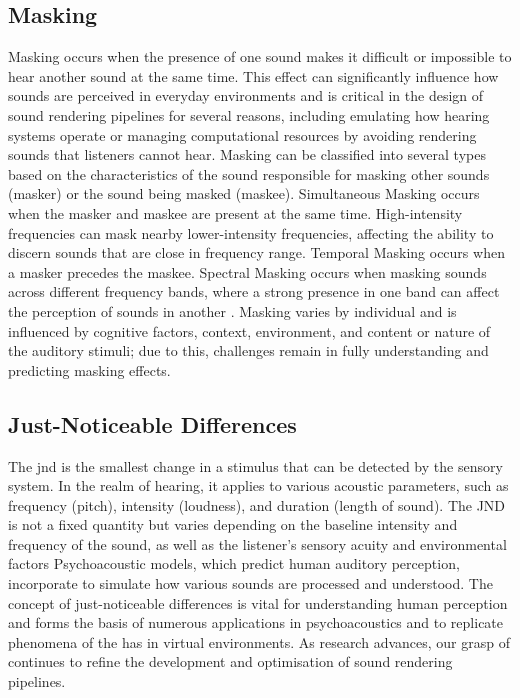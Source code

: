 \subsection{Masking}
Masking occurs when the presence of one sound makes it difficult or impossible to hear another sound at the same time. This effect can significantly influence how sounds are perceived in everyday environments and is critical in the design of sound rendering pipelines for several reasons, including emulating how hearing systems operate or managing computational resources by avoiding rendering sounds that listeners cannot hear.
Masking can be classified into several types based on the characteristics of the sound responsible for masking other sounds (masker) or the sound being masked (maskee). Simultaneous Masking occurs when the masker and maskee are present at the same time. High-intensity frequencies can mask nearby lower-intensity frequencies, affecting the ability to discern sounds that are close in frequency range. Temporal Masking occurs when a masker precedes the maskee. Spectral Masking occurs when masking sounds across different frequency bands, where a strong presence in one band can affect the perception of sounds in another \citep{howard2013acoustics}.
Masking varies by individual and is influenced by cognitive factors, context, environment, and content or nature of the auditory stimuli; due to this, challenges remain in fully understanding and predicting masking effects.

\subsection{Just-Noticeable Differences}
The \acrfull{jnd} is the smallest change in a stimulus that can be detected by the sensory system. In the realm of hearing, it applies to various acoustic parameters, such as frequency (pitch), intensity (loudness), and duration (length of sound). The JND is not a fixed quantity but varies depending on the baseline intensity and frequency of the sound, as well as the listener's sensory acuity and environmental factors \citep{dolhasz2021perceptually}
Psychoacoustic models, which predict human auditory perception, incorporate  to simulate how various sounds are processed and understood.  The concept of just-noticeable differences is vital for understanding human perception and forms the basis of numerous applications in psychoacoustics and to replicate phenomena of the \acrshort{has} in virtual environments. As research advances, our grasp of  continues to refine the development and optimisation of sound rendering pipelines.

